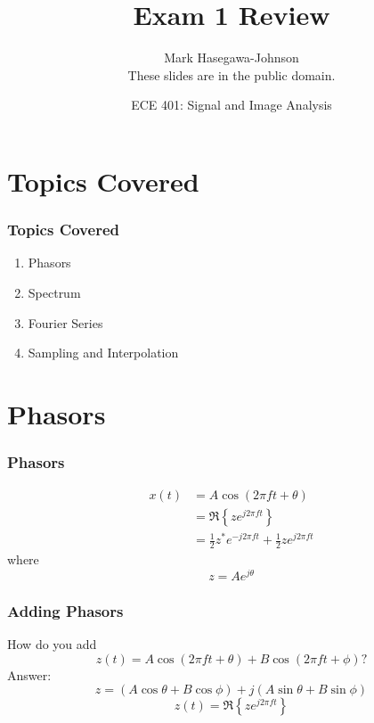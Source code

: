 \documentclass{beamer}
\title{Exam 1 Review}
\author{Mark Hasegawa-Johnson\\These slides are in the public domain.}
\date{ECE 401: Signal and Image Analysis}
\begin{document}
\begin{frame}
  \maketitle
\end{frame}

\begin{frame}
  \tableofcontents
\end{frame}

\section[Topics]{Topics Covered}
\setcounter{subsection}{1}

\begin{frame}
  \frametitle{Topics Covered}

  \begin{enumerate}
  \item Phasors
  \item Spectrum
  \item Fourier Series
  \item Sampling and Interpolation
  \end{enumerate}
\end{frame}

\section[Phasors]{Phasors}
\setcounter{subsection}{1}

\begin{frame}
  \frametitle{Phasors}

  \begin{align*}
    x(t) &= A \cos\left(2\pi f t+\theta\right) \\
    &= \Re\left\{ze^{j2\pi ft}\right\}\\
    &= \frac{1}{2}z^*e^{-j2\pi ft} + \frac{1}{2}z e^{j2\pi ft}
  \end{align*}
  where
  \[
  z = Ae^{j\theta}
  \]
\end{frame}

\begin{frame}
  \frametitle{Adding Phasors}

  How do you add
  \[
  z(t) = A\cos\left(2\pi ft+\theta\right) + B\cos\left(2\pi ft+\phi\right)?
  \]
  Answer:
  \[
  z = (A\cos\theta+B\cos\phi) + j(A\sin\theta+B\sin\phi)
  \]
  \[
  z(t) = \Re\left\{z e^{j2\pi ft}\right\}
  \]
\end{frame}
\end{document}
